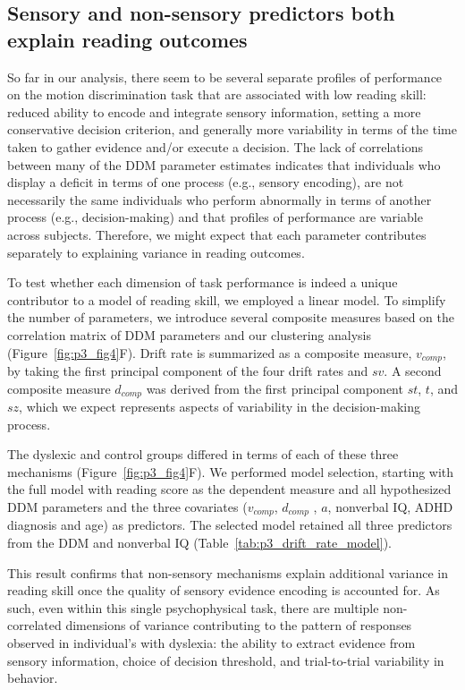 \documentclass[../uwthesis.tex]{subfiles}
\begin{document}
\subsection{Sensory and non-sensory predictors both explain reading outcomes}
So far in our analysis, there seem to be several separate profiles of performance on the motion discrimination task that are associated with low reading skill: reduced ability to encode and integrate sensory information, setting a more conservative decision criterion, and generally
more variability in terms of the time taken to gather evidence and/or execute a decision. The lack of correlations between many of the DDM parameter estimates indicates that individuals who display a deficit in terms of one process (e.g., sensory encoding), are not necessarily the same individuals who perform abnormally in terms of another process (e.g., decision-making) and that
profiles of performance are variable across subjects. Therefore, we might expect that each parameter contributes separately to explaining variance in reading outcomes.

To test whether each dimension of task performance is indeed a unique contributor to a model of reading skill, we employed a linear model. To simplify the number of parameters, we introduce several composite measures based on the correlation matrix of DDM parameters and our
clustering analysis (Figure~\ref{fig:p3_fig4}F). Drift rate is summarized as a composite measure, $v_{comp}$, by taking the first principal component of the four drift rates and $sv$. A second composite measure $d_{comp}$ was
derived from the first principal component $st$, $t$, and $sz$, which we expect represents aspects of variability in the decision-making process.

The dyslexic and control groups differed in terms of each of these three mechanisms (Figure~\ref{fig:p3_fig4}F). We performed model selection, starting with the full model with reading score as the dependent measure and all hypothesized DDM parameters and the three covariates ($v_{comp}$, $d_{comp}$ , $a$, nonverbal IQ, ADHD diagnosis and age) as predictors. The selected model retained all three predictors from the DDM and nonverbal IQ (Table~\ref{tab:p3_drift_rate_model}).

This result confirms that non-sensory mechanisms explain additional variance in reading skill once the quality of sensory evidence encoding is accounted for. As such, even within this single psychophysical task, there are multiple non-correlated dimensions of variance contributing to the pattern of responses observed in individual’s with dyslexia: the ability to extract evidence
from sensory information, choice of decision threshold, and trial-to-trial variability in behavior.
\end{document}
